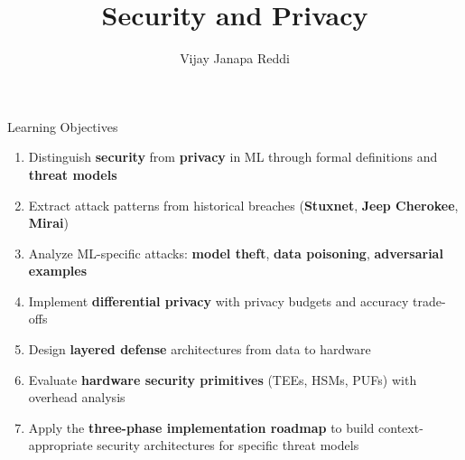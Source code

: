 \documentclass[aspectratio=169, 12pt]{beamer}
\title{Security and Privacy}
\author{Vijay Janapa Reddi}
\institute{Harvard University}
\date{}
\begin{document}

\begin{frame}{Learning Objectives}

\small
\begin{enumerate}
  \item Distinguish \textbf{security} from \textbf{privacy} in ML through formal definitions and \textbf{threat models}
  \item Extract attack patterns from historical breaches (\textbf{Stuxnet}, \textbf{Jeep Cherokee}, \textbf{Mirai})
  \item Analyze ML-specific attacks: \textbf{model theft}, \textbf{data poisoning}, \textbf{adversarial examples}
  \item Implement \textbf{differential privacy} with privacy budgets and accuracy trade-offs
  \item Design \textbf{layered defense} architectures from data to hardware
  \item Evaluate \textbf{hardware security primitives} (TEEs, HSMs, PUFs) with overhead analysis
  \item Apply the \textbf{three-phase implementation roadmap} to build context-appropriate security architectures for specific threat models
\end{enumerate}

\end{frame}
\end{document}
